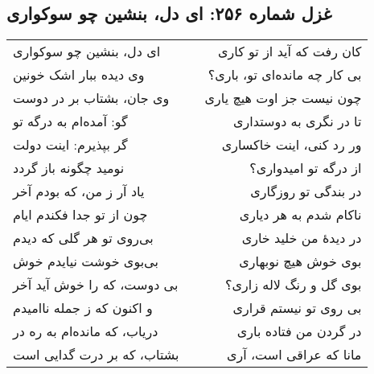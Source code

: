 \begin{center}
\section*{غزل شماره ۲۵۶: ای دل، بنشین چو سوکواری}
\label{sec:256}
\begin{longtable}{l p{0.5cm} r}
ای دل، بنشین چو سوکواری
&&
کان رفت که آید از تو کاری
\\
وی دیده ببار اشک خونین
&&
بی کار چه مانده‌ای تو، باری؟
\\
وی جان، بشتاب بر در دوست
&&
چون نیست جز اوت هیچ یاری
\\
گو: آمده‌ام به درگه تو
&&
تا در نگری به دوستداری
\\
گر بپذیرم: اینت دولت
&&
ور رد کنی، اینت خاکساری
\\
نومید چگونه باز گردد
&&
از درگه تو امیدواری؟
\\
یاد آر ز من، که بودم آخر
&&
در بندگی تو روزگاری
\\
چون از تو جدا فکندم ایام
&&
ناکام شدم به هر دیاری
\\
بی‌روی تو هر گلی که دیدم
&&
در دیدهٔ من خلید خاری
\\
بی‌بوی خوشت نیایدم خوش
&&
بوی خوش هیچ نوبهاری
\\
بی دوست، که را خوش آید آخر
&&
بوی گل و رنگ لاله زاری؟
\\
و اکنون که ز جمله ناامیدم
&&
بی روی تو نیستم قراری
\\
دریاب، که مانده‌ام به ره در
&&
در گردن من فتاده باری
\\
بشتاب، که بر درت گدایی است
&&
مانا که عراقی است، آری
\\
\end{longtable}
\end{center}
